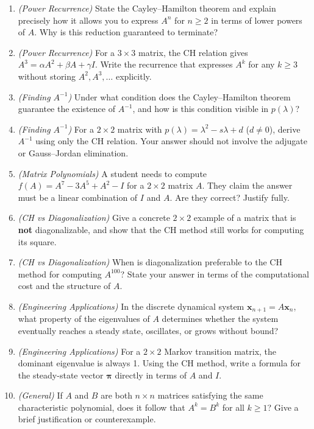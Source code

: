 \documentclass[12pt,a4paper]{article}
\begin{document}
\begin{enumerate}
  \item \textit{(Power Recurrence)} State the Cayley--Hamilton theorem and explain precisely how it allows you to express \(A^n\) for \(n \geq 2\) in terms of lower powers of \(A\). Why is this reduction guaranteed to terminate?

  \item \textit{(Power Recurrence)} For a \(3\times 3\) matrix, the CH relation gives \(A^3 = \alpha A^2 + \beta A + \gamma I\). Write the recurrence that expresses \(A^k\) for any \(k \geq 3\) without storing \(A^2, A^3, \ldots\) explicitly.

  \item \textit{(Finding \(A^{-1}\))} Under what condition does the Cayley--Hamilton theorem guarantee the existence of \(A^{-1}\), and how is this condition visible in \(p(\lambda)\)?

  \item \textit{(Finding \(A^{-1}\))} For a \(2\times 2\) matrix with \(p(\lambda) = \lambda^2 - s\lambda + d\) (\(d \neq 0\)), derive \(A^{-1}\) using only the CH relation. Your answer should not involve the adjugate or Gauss--Jordan elimination.

  \item \textit{(Matrix Polynomials)} A student needs to compute \(f(A) = A^7 - 3A^5 + A^2 - I\) for a \(2\times 2\) matrix \(A\). They claim the answer must be a linear combination of \(I\) and \(A\). Are they correct? Justify fully.

  \item \textit{(CH vs Diagonalization)} Give a concrete \(2\times 2\) example of a matrix that is \textbf{not} diagonalizable, and show that the CH method still works for computing its square.

  \item \textit{(CH vs Diagonalization)} When is diagonalization preferable to the CH method for computing \(A^{100}\)? State your answer in terms of the computational cost and the structure of \(A\).

  \item \textit{(Engineering Applications)} In the discrete dynamical system \(\mathbf{x}_{n+1} = A\mathbf{x}_n\), what property of the eigenvalues of \(A\) determines whether the system eventually reaches a steady state, oscillates, or grows without bound?

  \item \textit{(Engineering Applications)} For a \(2 \times 2\) Markov transition matrix, the dominant eigenvalue is always 1. Using the CH method, write a formula for the steady-state vector \(\boldsymbol{\pi}\) directly in terms of \(A\) and \(I\).

  \item \textit{(General)} If \(A\) and \(B\) are both \(n \times n\) matrices satisfying the same characteristic polynomial, does it follow that \(A^k = B^k\) for all \(k \geq 1\)? Give a brief justification or counterexample.
\end{enumerate}
\end{document}
